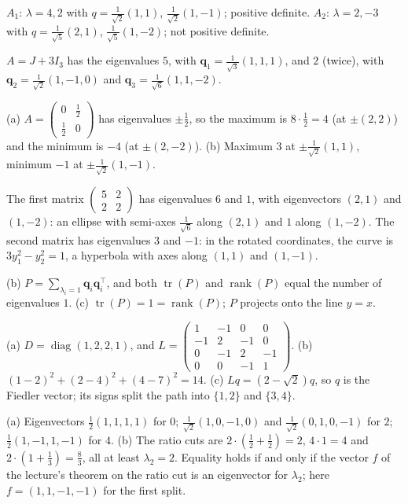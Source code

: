 \documentclass[11pt]{article}
\DeclareMathOperator{\rank}{rank}
\DeclareMathOperator{\tr}{tr}
\DeclareMathOperator{\diag}{diag}
\begin{document}
\begin{description}[leftmargin=0pt, itemsep=0.3em]
    \item[\ref{pr:spectral-2}.] $A_1$: $\lambda = 4, 2$ with $q = \frac{1}{\sqrt{2}}(1, 1)$, $\frac{1}{\sqrt{2}}(1, -1)$; positive definite. $A_2$: $\lambda = 2, -3$ with $q = \frac{1}{\sqrt{5}}(2, 1)$, $\frac{1}{\sqrt{5}}(1, -2)$; not positive definite.
    \item[\ref{pr:spectral-3}.] $A = J + 3I_3$ has the eigenvalues $5$, with $\mathbf{q}_1 = \frac{1}{\sqrt{3}}(1, 1, 1)$, and $2$ (twice), with $\mathbf{q}_2 = \frac{1}{\sqrt{2}}(1, -1, 0)$ and $\mathbf{q}_3 = \frac{1}{\sqrt{6}}(1, 1, -2)$.
    \item[\ref{pr:rayleigh}.] (a) $A = \begin{pmatrix} 0 & \frac{1}{2} \\ \frac{1}{2} & 0 \end{pmatrix}$ has eigenvalues $\pm\frac{1}{2}$, so the maximum is $8 \cdot \frac{1}{2} = 4$ (at $\pm(2, 2)$) and the minimum is $-4$ (at $\pm(2, -2)$). (b) Maximum $3$ at $\pm\frac{1}{\sqrt{2}}(1, 1)$, minimum $-1$ at $\pm\frac{1}{\sqrt{2}}(1, -1)$.
    \item[\ref{pr:quadric}.] The first matrix $\begin{pmatrix} 5 & 2 \\ 2 & 2 \end{pmatrix}$ has eigenvalues $6$ and $1$, with eigenvectors $(2, 1)$ and $(1, -2)$: an ellipse with semi-axes $\frac{1}{\sqrt{6}}$ along $(2, 1)$ and $1$ along $(1, -2)$. The second matrix has eigenvalues $3$ and $-1$: in the rotated coordinates, the curve is $3y_1^2 - y_2^2 = 1$, a hyperbola with axes along $(1, 1)$ and $(1, -1)$.
    \item[\ref{pr:sym-idempotent}.] (b) $P = \sum_{\lambda_i = 1} \mathbf{q}_i \mathbf{q}_i^\top$, and both $\tr(P)$ and $\rank(P)$ equal the number of eigenvalues $1$. (c) $\tr(P) = 1 = \rank(P)$; $P$ projects onto the line $y = x$.
    \item[\ref{pr:laplacian-path}.] (a) $D = \diag(1, 2, 2, 1)$, and $L = \begin{pmatrix} 1 & -1 & 0 & 0 \\ -1 & 2 & -1 & 0 \\ 0 & -1 & 2 & -1 \\ 0 & 0 & -1 & 1 \end{pmatrix}$. (b) $(1 - 2)^2 + (2 - 4)^2 + (4 - 7)^2 = 14$. (c) $Lq = (2 - \sqrt{2})q$, so $q$ is the Fiedler vector; its signs split the path into $\{1, 2\}$ and $\{3, 4\}$.
    \item[\ref{pr:laplacian-cycle}.] (a) Eigenvectors $\frac{1}{2}(1, 1, 1, 1)$ for $0$; $\frac{1}{\sqrt{2}}(1, 0, -1, 0)$ and $\frac{1}{\sqrt{2}}(0, 1, 0, -1)$ for $2$; $\frac{1}{2}(1, -1, 1, -1)$ for $4$. (b) The ratio cuts are $2 \cdot (\frac{1}{2} + \frac{1}{2}) = 2$, $4 \cdot 1 = 4$ and $2 \cdot (1 + \frac{1}{3}) = \frac{8}{3}$, all at least $\lambda_2 = 2$. Equality holds if and only if the vector $f$ of the lecture's theorem on the ratio cut is an eigenvector for $\lambda_2$; here $f = (1, 1, -1, -1)$ for the first split.

\end{description}
\end{document}
